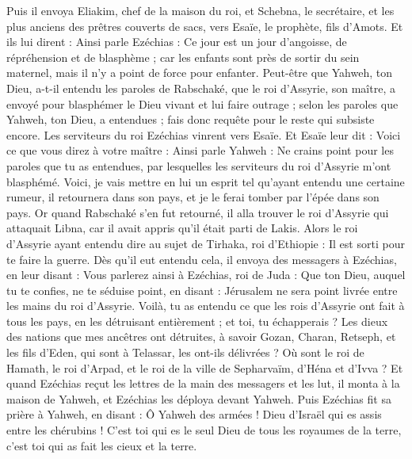 \begin{multicols}{2}
Puis il envoya Eliakim, chef de la maison du roi, et Schebna, le secrétaire, et les plus anciens des prêtres couverts de sacs, vers Esaïe, le prophète, fils d'Amots.
Et ils lui dirent : Ainsi parle Ezéchias : Ce jour est un jour d'angoisse, de répréhension et de blasphème ; car les enfants sont près de sortir du sein maternel, mais il n'y a point de force pour enfanter.
Peut-être que Yahweh, ton Dieu, a-t-il entendu les paroles de Rabschaké, que le roi d'Assyrie, son maître, a envoyé pour blasphémer le Dieu vivant et lui faire outrage ; selon les paroles que Yahweh, ton Dieu, a entendues ; fais donc requête pour le reste qui subsiste encore.
Les serviteurs du roi Ezéchias vinrent vers Esaïe.
Et Esaïe leur dit : Voici ce que vous direz à votre maître : Ainsi parle Yahweh : Ne crains point pour les paroles que tu as entendues, par lesquelles les serviteurs du roi d'Assyrie m'ont blasphémé.
Voici, je vais mettre en lui un esprit tel qu'ayant entendu une certaine rumeur, il retournera dans son pays, et je le ferai tomber par l'épée dans son pays.
Or quand Rabschaké s'en fut retourné, il alla trouver le roi d'Assyrie qui attaquait Libna, car il avait appris qu'il était parti de Lakis.
Alors le roi d'Assyrie ayant entendu dire au sujet de Tirhaka, roi d'Ethiopie : Il est sorti pour te faire la guerre. Dès qu'il eut entendu cela, il envoya des messagers à Ezéchias, en leur disant :
Vous parlerez ainsi à Ezéchias, roi de Juda : Que ton Dieu, auquel tu te confies, ne te séduise point, en disant : Jérusalem ne sera point livrée entre les mains du roi d'Assyrie.
Voilà, tu as entendu ce que les rois d'Assyrie ont fait à tous les pays, en les détruisant entièrement ; et toi, tu échapperais ?
Les dieux des nations que mes ancêtres ont détruites, à savoir Gozan, Charan, Retseph, et les fils d'Eden, qui sont à Telassar, les ont-ils délivrées ?
Où sont le roi de Hamath, le roi d'Arpad, et le roi de la ville de Sepharvaïm, d'Héna et d'Ivva ?
Et quand Ezéchias reçut les lettres de la main des messagers et les lut, il monta à la maison de Yahweh, et Ezéchias les déploya devant Yahweh.
Puis Ezéchias fit sa prière à Yahweh, en disant :
Ô Yahweh des armées ! Dieu d'Israël qui es assis entre les chérubins ! C'est toi qui es le seul Dieu de tous les royaumes de la terre, c'est toi qui as fait les cieux et la terre.

\end{multicols}
